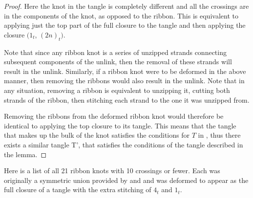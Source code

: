 \begin{paper}
\begin{proof}
Here the knot in the tangle is completely different and all the crossings are in
the components of the knot, as opposed to the ribbon.
This is equivalent to applying just the top part of the full closure to the
tangle and then applying the closure $(1_t$, $(2n)_t)$.


Note that since any ribbon knot is a series of unzipped strands connecting
subsequent components of the unlink, then the removal of these strands will
result in the unlink.
Similarly, if a ribbon knot were to be deformed in the above manner, then
removing the ribbons would also result in the unlink.
Note that in any situation, removing a ribbon is equivalent to unzipping
it, cutting both strands of the ribbon, then stitching each strand to the one it
was unzipped from.


Removing the ribbons from the deformed ribbon knot would therefore be identical
to applying the top closure to its tangle.
This means that the tangle that makes up the bulk of the knot satisfies the
conditions for $T$ in \lemTangles, thus there exists a similar tangle T', that
satisfies the conditions of the tangle described in the lemma.
\end{proof}

Here is a list of all 21 ribbon knots with 10 crossings or fewer.
Each was originally a symmetric union provided by \cite{oneknot} and
\cite{manyknots} and was deformed to appear as the full closure of a tangle with
the extra stitching of $4_t$ and $1_t$.
\end{paper}

